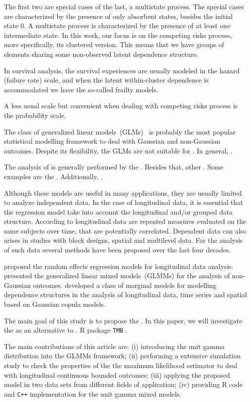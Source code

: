 \documentclass[a4paper,12pt]{article}
\begin{document}
The first two are special cases of the last, a multistate process. The
special cases are characterized by the presence of only absorbent
states, besides the initial state 0. A multistate process is
characterized by the presence of at least one intermediate state. In
this work, our focus is on the competing risks process, more
specifically, its clustered version. This means that we have groups of
elements sharing some non-observed latent dependence structure.

In survival analysis, the survival experiences are usually modeled in
the hazard (failure rate) scale, and when the latent within-cluster
dependence is accommodated we have the so-called frailty models.

A less usual scale but convenient when dealing with competing risks
process is the probability scale.

The class of generalized linear models~(GLMs)~\citep{GLM72}
is probably the most popular statistical modelling framework to deal
with Gaussian and non-Gaussian outcomes. Despite its flexibility, the
GLMs are not suitable for . In general, .

The analysis of is generally performed by the . Besides that, other
. Some examples are the . Additionally, .

Although these models are useful in many applications, they are usually
limited to analyze independent data. In the case of longitudinal data,
it is essential that the regression model take into account the
longitudinal and/or grouped data structure. According to \cite{}
longitudinal data are repeated measures evaluated on the same subjects
over time, that are potentially correlated. Dependent data can also
arises in studies with block designs, spatial and multilevel data. For
the analysis of such data several methods have been proposed over the
last four decades.

\cite{laird82} proposed the random effects regression models for
longitudinal data analysis. \cite{breslow93} presented the generalized
linear mixed models~(GLMMs) for the analysis of non-Gaussian
outcomes. \cite{gcmr} developed a class of marginal models for modelling
dependence structures in the analysis of longitudinal data, time series
and spatial based on Gaussian copula models.

The main goal of this study is to propose the . In this paper, we will
investigate the as an alternative to . R \citep{R21} package
\texttt{TMB} \citep{TMb}.

The main contributions of this article are: (i) introducing the unit
gamma distribution into the GLMMs framework; (ii) performing a extensive
simulation study to check the properties of the the maximum likelihood
estimator to deal with longitudinal continuous bounded outcomes; (iii)
applying the proposed model in two data sets from different fields of
application; (iv) providing R code and \texttt{C++} implementation for
the unit gamma mixed models.
\end{document}
